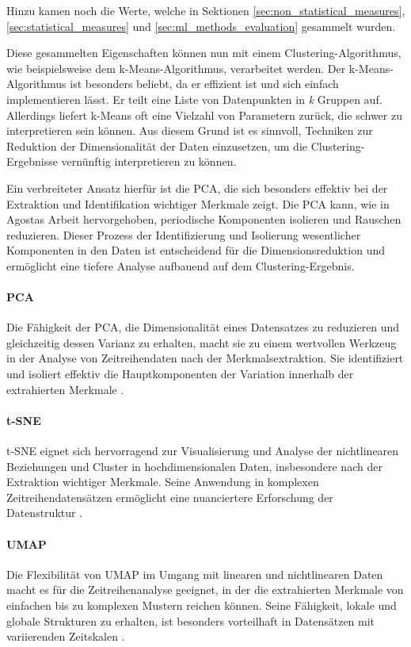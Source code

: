 Hinzu kamen noch die Werte, welche in Sektionen \ref{sec:non_statistical_measures}, \ref{sec:statistical_measures} und \ref{sec:ml_methods_evaluation} gesammelt wurden.

Diese gesammelten Eigenschaften können nun mit einem Clustering-Algorithmus, wie beispielsweise dem k-Means-Algorithmus, verarbeitet werden. 
Der k-Means-Algorithmus ist besonders beliebt, da er effizient ist und sich einfach implementieren lässt. Er teilt eine Liste von Datenpunkten in \textit{k} Gruppen auf. 
Allerdings liefert k-Means oft eine Vielzahl von Parametern zurück, die schwer zu interpretieren sein können. Aus diesem Grund ist es sinnvoll, Techniken zur Reduktion der Dimensionalität der Daten einzusetzen, 
um die Clustering-Ergebnisse vernünftig interpretieren zu können.

Ein verbreiteter Ansatz hierfür ist die \acf{PCA}, die sich besonders effektiv bei der Extraktion und Identifikation wichtiger Merkmale zeigt. 
Die PCA kann, wie in Agostas Arbeit\cite{agosta} hervorgehoben, periodische Komponenten isolieren und Rauschen reduzieren. Dieser Prozess der Identifizierung und Isolierung wesentlicher Komponenten in den Daten ist entscheidend 
für die Dimensionsreduktion und ermöglicht eine tiefere Analyse aufbauend auf dem Clustering-Ergebnis.


\paragraph{\acf{PCA}}
Die Fähigkeit der PCA, die Dimensionalität eines Datensatzes zu reduzieren und gleichzeitig dessen Varianz zu erhalten, macht sie zu einem wertvollen Werkzeug in der Analyse von Zeitreihendaten nach der Merkmalsextraktion. 
Sie identifiziert und isoliert effektiv die Hauptkomponenten der Variation innerhalb der extrahierten Merkmale \cite{agosta}.

\paragraph{\acf{t-SNE}}
t-SNE eignet sich hervorragend zur Visualisierung und Analyse der nichtlinearen Beziehungen und Cluster in hochdimensionalen Daten, 
insbesondere nach der Extraktion wichtiger Merkmale. Seine Anwendung in komplexen Zeitreihendatensätzen ermöglicht eine nuanciertere Erforschung der Datenstruktur \cite{8851847}.

\paragraph{\acf{UMAP}}
Die Flexibilität von UMAP im Umgang mit linearen und nichtlinearen Daten macht es für die Zeitreihenanalyse geeignet, 
in der die extrahierten Merkmale von einfachen bis zu komplexen Mustern reichen können. Seine Fähigkeit, lokale und globale Strukturen zu erhalten, ist besonders vorteilhaft in Datensätzen mit variierenden Zeitskalen \cite{9412261}.

